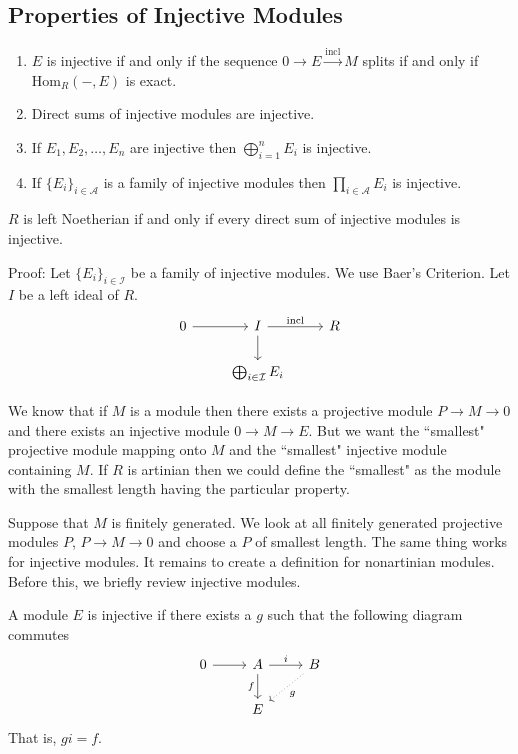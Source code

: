 \subsection{Properties of Injective Modules}

\begin{enumerate}[1.]
\item $E$ is injective if and only if the sequence $0 \longrightarrow E \stackrel{\text{incl}}{\longrightarrow} M$ splits if and only if $\text{Hom}_R(-,E)$ is exact. 
\item Direct sums of injective modules are injective.
\item If $E_1,E_2,\ldots,E_n$ are injective then $\bigoplus_{i=1}^n E_i$ is injective.
\item If $\{E_i\}_{i \in \mathcal{A}}$ is a family of injective modules then $\prod_{i \in \mathcal{A}} E_i$ is injective. 
\end{enumerate}

\begin{thm}
$R$ is left Noetherian if and only if every direct sum of injective modules is injective. 
\end{thm}

Proof: Let $\{E_i\}_{i \in \mathcal{I}}$ be a family of injective modules. We use Baer's Criterion. Let $I$ be a left ideal of $R$.
\[
\begin{tikzcd}
0 \arrow{r} & I \arrow{d} \arrow{r}{\text{incl}} & R \\
 & \bigoplus_{i \in \mathcal{I}} E_i & 
\end{tikzcd}
\]


We know that if $M$ is a module then there exists a projective module $P \longrightarrow M \longrightarrow 0$ and there exists an injective module $0 \longrightarrow M \longrightarrow E$. But we want the ``smallest" projective module mapping onto $M$ and the ``smallest" injective module containing $M$. If $R$ is artinian then we could define the ``smallest" as the module with the smallest length having the particular property. 

Suppose that $M$ is finitely generated. We look at all finitely generated projective modules $P$, $P \longrightarrow M \longrightarrow 0$ and choose a $P$ of smallest length. The same thing works for injective modules. It remains to create a definition for nonartinian modules. Before this, we briefly review injective modules.

\begin{dfn}
A module $E$ is injective if there exists a $g$ such that the following diagram commutes
\[
\begin{tikzcd}
0 \arrow{r} & A \arrow{r}{i} \arrow[swap]{d}{f} & B \arrow[dotted]{dl}{g} \\
 & E & 
\end{tikzcd}
\]
That is, $gi=f$.
\end{dfn}

